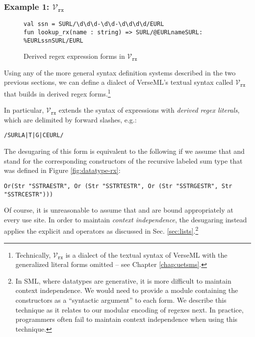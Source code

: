 \subsubsection{Example 1: $\mathcal{V}_\texttt{rx}$}
\begin{figure}
\begin{lstlisting}[numbers=none]
val ssn = SURL/\d\d\d-\d\d-\d\d\d\d/EURL
fun lookup_rx(name : string) => SURL/@EURLnameSURL: %EURLssnSURL/EURL
\end{lstlisting}
\caption{Derived regex expression forms in $\mathcal{V}_\texttt{rx}$}
\label{fig:derived-spliced-subexpressions}
\end{figure}
Using any of the more general syntax definition systems described in the two previous sections, we can define a dialect of VerseML's textual syntax called  $\mathcal{V}_\texttt{rx}$ that builds in derived regex forms.\footnote{Technically, $\mathcal{V}_\texttt{rx}$ is a dialect of the textual syntax of VerseML with the generalized literal forms omitted -- see Chapter \ref{chap:uetsms}.} 

In particular, $\mathcal{V}_\texttt{rx}$ extends the syntax of expressions with  \emph{derived regex literals}, which are delimited by forward slashes, e.g.:
\begin{lstlisting}[numbers=none]
/SURLA|T|G|CEURL/
\end{lstlisting}
The desugaring of this form is equivalent to the following if we assume that  and  stand for the corresponding constructors of the recursive labeled sum type  that was defined in Figure \ref{fig:datatype-rx}:
\begin{lstlisting}[numbers=none]
Or(Str "SSTRAESTR", Or (Str "SSTRTESTR", Or (Str "SSTRGESTR", Str "SSTRCESTR")))
\end{lstlisting}
Of course, it is unreasonable to assume that  and  are bound appropriately at every use site. In order to maintain \emph{context independence}, the desugaring instead applies the explicit  and  operators as discussed in Sec. \ref{sec:lists}.\footnote{In SML, where datatypes are generative, it is more difficult to maintain context independence. We would need to provide a module containing the constructors as a ``syntactic argument'' to each form. We describe this technique as it relates to our modular encoding of regexes next. In practice, programmers often fail to maintain context independence when using this technique.}



